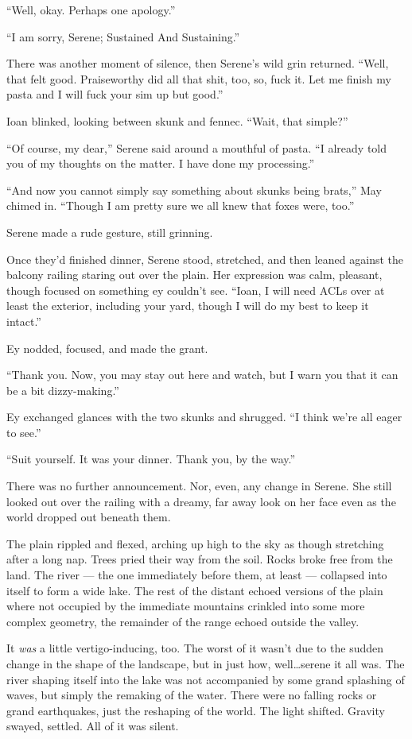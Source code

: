 ``Well, okay. Perhaps one apology.''

``I am sorry, Serene; Sustained And Sustaining.''

There was another moment of silence, then Serene's wild grin returned. ``Well, that felt good. Praiseworthy did all that shit, too, so, fuck it. Let me finish my pasta and I will fuck your sim up but good.''

Ioan blinked, looking between skunk and fennec. ``Wait, that simple?''

``Of course, my dear,'' Serene said around a mouthful of pasta. ``I already told you of my thoughts on the matter. I have done my processing.''

``And now you cannot simply say something about skunks being brats,'' May chimed in. ``Though I am pretty sure we all knew that foxes were, too.''

Serene made a rude gesture, still grinning.

Once they'd finished dinner, Serene stood, stretched, and then leaned against the balcony railing staring out over the plain. Her expression was calm, pleasant, though focused on something ey couldn't see. ``Ioan, I will need ACLs over at least the exterior, including your yard, though I will do my best to keep it intact.''

Ey nodded, focused, and made the grant.

``Thank you. Now, you may stay out here and watch, but I warn you that it can be a bit dizzy-making.''

Ey exchanged glances with the two skunks and shrugged. ``I think we're all eager to see.''

``Suit yourself. It was your dinner. Thank you, by the way.''

There was no further announcement. Nor, even, any change in Serene. She still looked out over the railing with a dreamy, far away look on her face even as the world dropped out beneath them.

The plain rippled and flexed, arching up high to the sky as though stretching after a long nap. Trees pried their way from the soil. Rocks broke free from the land. The river — the one immediately before them, at least — collapsed into itself to form a wide lake. The rest of the distant echoed versions of the plain where not occupied by the immediate mountains crinkled into some more complex geometry, the remainder of the range echoed outside the valley.

It \emph{was} a little vertigo-inducing, too. The worst of it wasn't due to the sudden change in the shape of the landscape, but in just how, well\ldots serene it all was. The river shaping itself into the lake was not accompanied by some grand splashing of waves, but simply the remaking of the water. There were no falling rocks or grand earthquakes, just the reshaping of the world. The light shifted. Gravity swayed, settled. All of it was silent.

